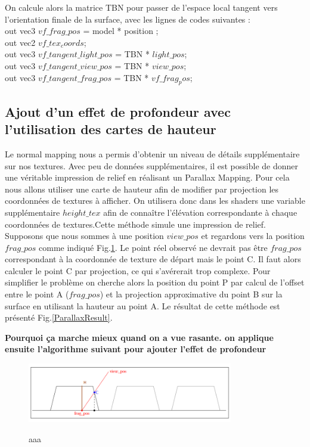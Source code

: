 \documentclass[a4paper]{article}
\begin{document}
On calcule  alors la matrice TBN pour passer de l'espace local tangent vers l'orientation finale de la surface, avec les lignes de codes suivantes :\\ 
out vec3 $vf\_frag\_pos$ = model * position ;\\
out vec2 $vf\_tex_coords$;\\
out vec3 $vf\_tangent\_light\_pos$ = TBN * $light\_pos$;\\
out vec3 $vf\_tangent\_view\_pos$ = TBN * $view\_pos$;\\
out vec3 $vf\_tangent\_frag\_pos$ = TBN * $vf\_frag_pos$;\\




\subsection{Ajout d'un effet de profondeur avec l'utilisation des cartes de hauteur}
Le normal mapping nous a permis d'obtenir un niveau de détails supplémentaire sur nos textures. Avec peu de données supplémentaires, il est possible de donner une véritable impression de relief en réalisant un Parallax Mapping. Pour cela nous allons utiliser une carte de hauteur afin de modifier par projection les coordonnées de textures à afficher. On utilisera donc dans les shaders une variable supplémentaire $height\_tex$ afin de connaître l'élévation correspondante à chaque coordonnées de textures.Cette méthode simule une impression de relief. \\

Supposons que nous sommes à une position $view\_pos$ et regardons vers la position $frag\_pos$ comme indiqué Fig.\ref{parallaxtheory}. Le point réel observé ne devrait pas être $frag\_pos$ correspondant à la coordonnée de texture de départ mais le point C. Il faut alors calculer le point C par projection, ce qui s’avérerait trop complexe. Pour simplifier le problème on cherche alors la position du point P par calcul de l'offset entre le point A ($frag\_pos$) et la projection approximative du point B sur la surface en utilisant la hauteur au point A. Le résultat de cette méthode est présenté Fig.\ref{ParallaxResult}.

\textbf{Pourquoi ça marche mieux quand on a vue rasante. on applique ensuite l'algorithme suivant pour ajouter l'effet de profondeur}

\begin{figure}[H]
\centering
\includegraphics[width=0.8\textwidth]{figures/parallax.png}
\label{parallaxtheory}
\caption{aaa}
\end{figure}
\end{document}
